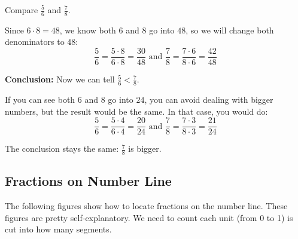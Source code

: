 \begin{myexample}
Compare $\frac{5}{6}$ and $\frac{7}{8}$.
\label{ex:u3l1CompareFractions}
\end{myexample}
\begin{solution}
Since $6\cdot8=48$, we know both $6$ and $8$ go into $48$, so we will change both denominators to $48$:
\[ \frac{5}{6} = \frac{5\cdot8}{6\cdot8} = \frac{30}{48} \text{ and } \frac{7}{8} = \frac{7\cdot6}{8\cdot6} = \frac{42}{48} \]

\textbf{Conclusion:} Now we can tell $\frac{5}{6}<\frac{7}{8}$.

If you can see both $6$ and $8$ go into $24$, you can avoid dealing with bigger numbers, but the result would be the same. In that case, you would do:
\[ \frac{5}{6} = \frac{5\cdot4}{6\cdot4} = \frac{20}{24} \text{ and } \frac{7}{8} = \frac{7\cdot3}{8\cdot3} = \frac{21}{24} \]

The conclusion stays the same: $\frac{7}{8}$ is bigger.
\end{solution}

\subsection{Fractions on Number Line}
The following figures show how to locate fractions on the number line. These figures are pretty self-explanatory. We need to count each unit (from 0 to 1) is cut into how many segments.

